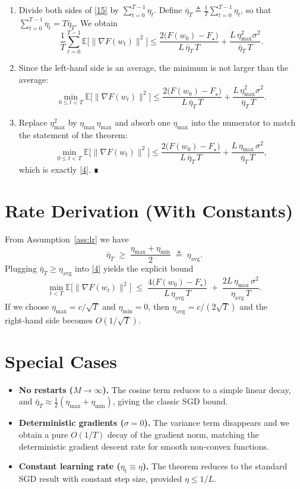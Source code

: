 \documentclass{article}
\newcommand{\EE}{\mathbb{E}}
\begin{document}
\begin{enumerate}
\item[Step 10.] Divide both sides of \eqref{15} by $\sum_{t=0}^{T-1}\eta_t$.
Define $\bar\eta_T\triangleq \frac{1}{T}\sum_{t=0}^{T-1}\eta_t$,
so that $\sum_{t=0}^{T-1}\eta_t = T\bar\eta_T$.
We obtain
\[
\frac{1}{T}\sum_{t=0}^{T-1}\EE\bigl[\|\nabla F(w_t)\|^{2}\bigr]
\le
\frac{2\bigl(F(w_0)-F_\star\bigr)}{L\,\bar\eta_T\,T}
+ \frac{L\,\eta_{\max}^{2}\sigma^{2}}{\bar\eta_T\,T}.
\tag{16}
\]

\item[Step 11.] Since the left‑hand side is an average, the minimum is not larger
than the average:
\[
\min_{0\le t<T}\EE\bigl[\|\nabla F(w_t)\|^{2}\bigr]
\le
\frac{2\bigl(F(w_0)-F_\star\bigr)}{L\,\bar\eta_T\,T}
+ \frac{L\,\eta_{\max}^{2}\sigma^{2}}{\bar\eta_T\,T}.
\tag{17}
\]

\item[Step 12.] Replace $\eta_{\max}^{2}$ by $\eta_{\max}\,\eta_{\max}$ and absorb one
$\eta_{\max}$ into the numerator to match the statement of the theorem:
\[
\min_{0\le t<T}\EE\bigl[\|\nabla F(w_t)\|^{2}\bigr]
\le
\frac{2\bigl(F(w_0)-F_\star\bigr)}{L\,\bar\eta_T\,T}
+ \frac{L\,\eta_{\max}\,\sigma^{2}}{\bar\eta_T\,T},
\]
which is exactly \eqref{4}.  ∎
\end{enumerate}

\section*{Rate Derivation (With Constants)}
From Assumption~\ref{ass:lr} we have
\[
\bar\eta_T\;\ge\;\frac{\eta_{\max}+\eta_{\min}}{2}\;\triangleq\;\eta_{\text{avg}}.
\]
Plugging $\bar\eta_T\ge\eta_{\text{avg}}$ into \eqref{4} yields the explicit bound
\[
\min_{t<T}\EE\bigl[\|\nabla F(w_t)\|^{2}\bigr]
\;\le\;
\frac{4\bigl(F(w_0)-F_\star\bigr)}{L\,\eta_{\text{avg}}\,T}
\;+\;
\frac{2L\,\eta_{\max}\,\sigma^{2}}{\eta_{\text{avg}}\,T}.
\tag{18}
\]
If we choose $\eta_{\max}=c/\sqrt{T}$ and $\eta_{\min}=0$, then
$\eta_{\text{avg}}=c/(2\sqrt{T})$ and the right‑hand side becomes
$O(1/\sqrt{T})$.

\section*{Special Cases}
\begin{itemize}
\item \textbf{No restarts ($M\to\infty$).} The cosine term reduces to a simple linear decay,
and $\bar\eta_T\approx \tfrac12(\eta_{\max}+\eta_{\min})$, giving the classic SGD bound.

\item \textbf{Deterministic gradients ($\sigma=0$).} The variance term disappears and we obtain a pure $O(1/T)$ decay of the gradient norm, matching the deterministic gradient descent rate for smooth non‑convex functions.

\item \textbf{Constant learning rate ($\eta_t\equiv\eta$).} The theorem reduces to the standard SGD result with constant step size, provided $\eta\le 1/L$.
\end{itemize}
\end{document}
